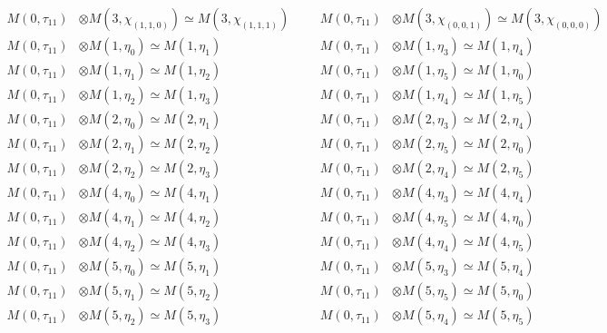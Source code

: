 \begin{align*}
M(0,\tau_{11}) &\otimes M(3,\chi_{(1,1,0)}) \simeq M(3,\chi_{(1,1,1)}) &&& M(0,\tau_{11}) &\otimes M(3,\chi_{(0,0,1)}) \simeq M(3,\chi_{(0,0,0)})\\
M(0,\tau_{11}) &\otimes M(1,\eta_{0}) \simeq M(1,\eta_{1}) &&& M(0,\tau_{11}) &\otimes M(1,\eta_{3}) \simeq M(1,\eta_{4})\\
M(0,\tau_{11}) &\otimes M(1,\eta_{1}) \simeq M(1,\eta_{2}) &&& M(0,\tau_{11}) &\otimes M(1,\eta_{5}) \simeq M(1,\eta_{0})\\
M(0,\tau_{11}) &\otimes M(1,\eta_{2}) \simeq M(1,\eta_{3}) &&& M(0,\tau_{11}) &\otimes M(1,\eta_{4}) \simeq M(1,\eta_{5})\\
M(0,\tau_{11}) &\otimes M(2,\eta_{0}) \simeq M(2,\eta_{1}) &&& M(0,\tau_{11}) &\otimes M(2,\eta_{3}) \simeq M(2,\eta_{4})\\
M(0,\tau_{11}) &\otimes M(2,\eta_{1}) \simeq M(2,\eta_{2}) &&& M(0,\tau_{11}) &\otimes M(2,\eta_{5}) \simeq M(2,\eta_{0})\\
M(0,\tau_{11}) &\otimes M(2,\eta_{2}) \simeq M(2,\eta_{3}) &&& M(0,\tau_{11}) &\otimes M(2,\eta_{4}) \simeq M(2,\eta_{5})\\
M(0,\tau_{11}) &\otimes M(4,\eta_{0}) \simeq M(4,\eta_{1}) &&& M(0,\tau_{11}) &\otimes M(4,\eta_{3}) \simeq M(4,\eta_{4})\\
M(0,\tau_{11}) &\otimes M(4,\eta_{1}) \simeq M(4,\eta_{2}) &&& M(0,\tau_{11}) &\otimes M(4,\eta_{5}) \simeq M(4,\eta_{0})\\
M(0,\tau_{11}) &\otimes M(4,\eta_{2}) \simeq M(4,\eta_{3}) &&& M(0,\tau_{11}) &\otimes M(4,\eta_{4}) \simeq M(4,\eta_{5})\\
M(0,\tau_{11}) &\otimes M(5,\eta_{0}) \simeq M(5,\eta_{1}) &&& M(0,\tau_{11}) &\otimes M(5,\eta_{3}) \simeq M(5,\eta_{4})\\
M(0,\tau_{11}) &\otimes M(5,\eta_{1}) \simeq M(5,\eta_{2}) &&& M(0,\tau_{11}) &\otimes M(5,\eta_{5}) \simeq M(5,\eta_{0})\\
M(0,\tau_{11}) &\otimes M(5,\eta_{2}) \simeq M(5,\eta_{3}) &&& M(0,\tau_{11}) &\otimes M(5,\eta_{4}) \simeq M(5,\eta_{5})\\
\end{align*}

